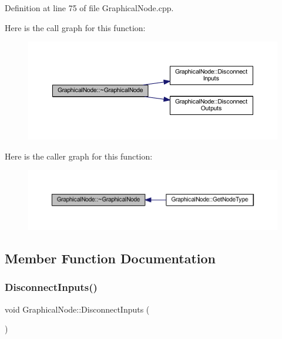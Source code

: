 Definition at line 75 of file Graphical\+Node.\+cpp.

Here is the call graph for this function\+:
\nopagebreak
\begin{figure}[H]
\begin{center}
\leavevmode
\includegraphics[width=350pt]{class_graphical_node_a044a09111bb337580f2a40fcff42ef6f_cgraph}
\end{center}
\end{figure}
Here is the caller graph for this function\+:
\nopagebreak
\begin{figure}[H]
\begin{center}
\leavevmode
\includegraphics[width=350pt]{class_graphical_node_a044a09111bb337580f2a40fcff42ef6f_icgraph}
\end{center}
\end{figure}


\subsection{Member Function Documentation}
\mbox{\label{class_graphical_node_adf7b68c28c70426681cef018d34f8988}} 
\subsubsection{\texorpdfstring{Disconnect\+Inputs()}{DisconnectInputs()}}
{\footnotesize\ttfamily void Graphical\+Node\+::\+Disconnect\+Inputs (\begin{DoxyParamCaption}{ }\end{DoxyParamCaption})}



